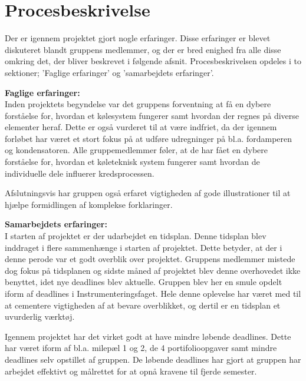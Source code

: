 \documentclass[Hovedrapport.tex]{subfiles}
\begin{document}
\newpage
\section{Procesbeskrivelse}
Der er igennem projektet gjort nogle erfaringer. Disse erfaringer er blevet diskuteret blandt gruppens medlemmer, og der er bred enighed fra alle disse omkring det, der bliver beskrevet i følgende afsnit. Procesbeskrivelsen opdeles i to sektioner; 'Faglige erfaringer' og 'samarbejdets erfaringer'.

\textbf{Faglige erfaringer:} \\
Inden projektets begyndelse var det gruppens forventning at få en dybere forståelse for, hvordan et kølesystem fungerer samt hvordan der regnes på diverse elementer heraf. Dette er også vurderet til at være indfriet, da der igennem forløbet har været et stort fokus på at udføre udregninger på bl.a. fordamperen og kondensatoren.   
Alle gruppemedlemmer føler, at de har fået en dybere forståelse for, hvordan et køleteknisk system fungerer samt hvordan de individuelle dele influerer kredsprocessen. 

Afslutningsvis har gruppen også erfaret vigtigheden af gode illustrationer til at hjælpe formidlingen af komplekse forklaringer. 

\textbf{Samarbejdets erfaringer:} \\
I starten af projektet er der udarbejdet en tidsplan. Denne tidsplan blev inddraget i flere sammenhænge i starten af projektet. Dette betyder, at der i denne perode var et godt overblik over projektet. Gruppens medlemmer mistede dog fokus på tidsplanen og sidste måned af projektet blev denne overhovedet ikke benyttet, idet nye deadlines blev aktuelle. Gruppen blev her en smule opdelt iform af deadlines i Instrumenteringsfaget. 
Hele denne oplevelse har været med til at cementere vigtigheden af at bevare overblikket, og dertil er en tidsplan et uvurderlig værktøj.

Igennem projektet har det virket godt at have mindre løbende deadlines. Dette har været iform af bl.a. milepæl 1 og 2, de 4 portifolioopgaver samt mindre deadlines selv opstillet af gruppen. De løbende deadlines har gjort at gruppen har arbejdet effektivt og målrettet for at opnå kravene til fjerde semester.
\end{document}
